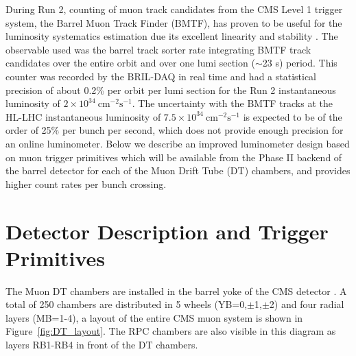 During Run 2, counting of muon track candidates from the CMS Level 1 trigger system, the Barrel Muon Track Finder (BMTF),
has proven to be useful for the luminosity systematics estimation due its excellent linearity and stability \cite{LUM-17-001}.
The observable used was the barrel track sorter rate integrating BMTF track candidates over the entire orbit and over one lumi section ($\sim$23 s) period.
This counter was recorded by the BRIL-DAQ in real time and had a statistical precision of about 0.2\% per orbit per lumi section for the Run 2 instantaneous luminosity of  $2\times10^{34}\ \text{cm}^{-2}\text{s}^{-1}$.
The  uncertainty with the BMTF tracks at the HL-LHC instantaneous luminosity of $7.5\times10^{34}\ \text{cm}^{-2}\text{s}^{-1}$
is expected to be of the order of 25\% per bunch per second, which does not provide enough precision for an online luminometer.
Below we describe an improved luminometer design based on muon trigger primitives which will be available 
from the Phase II backend of the barrel detector for each of the Muon Drift Tube (DT) chambers, and provides higher count rates per bunch crossing.


\section{Detector Description and Trigger Primitives}

The Muon DT chambers are installed in the barrel yoke of the CMS detector \cite{DT-2009}.
A total of 250 chambers are distributed in 5 wheels (YB=0,$\pm$1,$\pm$2) and four radial layers (MB=1-4),
a layout of the entire  CMS muon system is shown in Figure~\ref{fig:DT_layout}.
The RPC chambers are also visible in this diagram as layers RB1-RB4 in front of the DT chambers.

